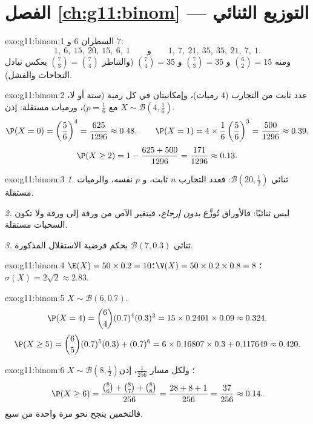\section*{الفصل \ref{ch:g11:binom} --- التوزيع الثنائي}

\begin{solution}{exo:g11:binom:1}
السطران $6$ و $7$:
\[
1,\ 6,\ 15,\ 20,\ 15,\ 6,\ 1
\qquad\text{و}\qquad
1,\ 7,\ 21,\ 35,\ 35,\ 21,\ 7,\ 1 .
\]
ومنه $\binom62 = 15$ و $\binom73 = 35$ و $\binom74 = 35$ (والتناظر
$\binom73 = \binom74$ يعكس تبادل النجاحات والفشل).
\end{solution}

\begin{solution}{exo:g11:binom:2}
عدد ثابت من التجارب ($4$ رميات)، وإمكانيتان في كل رمية (ستة أو لا،
مع $p = \frac16$)، ورميات مستقلة: إذن $X \sim \mathcal B(4, \frac16)$.
\[
\P(X=0) = \left(\frac56\right)^4 = \frac{625}{1296} \approx 0.48,
\qquad
\P(X=1) = 4 \times \frac16\left(\frac56\right)^3 = \frac{500}{1296}
\approx 0.39,
\]
\[
\P(X \geq 2) = 1 - \frac{625 + 500}{1296} = \frac{171}{1296}
\approx 0.13 .
\]
\end{solution}

\begin{solution}{exo:g11:binom:3}
\emph{1.} ثنائي $\mathcal B(20, \frac12)$: فعدد التجارب $n$ ثابت، و $p$ نفسه،
والرميات مستقلة.

\emph{2.} ليس ثنائيًا: فالأوراق تُوزَّع \emph{بدون إرجاع}،
فيتغير  الآص من ورقة إلى ورقة ولا تكون السحبات
مستقلة.

\emph{3.} ثنائي $\mathcal B(7, 0.3)$ بحكم فرضية الاستقلال
المذكورة.
\end{solution}

\begin{solution}{exo:g11:binom:4}
$\E(X) = 50 \times 0.2 = 10$؛
$\V(X) = 50 \times 0.2 \times 0.8 = 8$؛
$\sigma(X) = 2\sqrt2 \approx 2.83$.
\end{solution}

\begin{solution}{exo:g11:binom:5}
$X \sim \mathcal B(6, 0.7)$.
\[
\P(X = 4) = \binom64 (0.7)^4 (0.3)^2 = 15 \times 0.2401 \times 0.09
\approx 0.324 .
\]
\[
\P(X \geq 5) = \binom65 (0.7)^5(0.3) + (0.7)^6
= 6 \times 0.16807 \times 0.3 + 0.117649 \approx 0.420 .
\]
\end{solution}

\begin{solution}{exo:g11:binom:6}
$X \sim \mathcal B\left(8, \frac12\right)$؛ ولكل مسار 
$\frac{1}{256}$، إذن
\[
\P(X \geq 6) = \frac{\binom86 + \binom87 + \binom88}{256}
= \frac{28 + 8 + 1}{256} = \frac{37}{256} \approx 0.14 .
\]
فالتخمين ينجح نحو مرة واحدة من سبع.
\end{solution}

